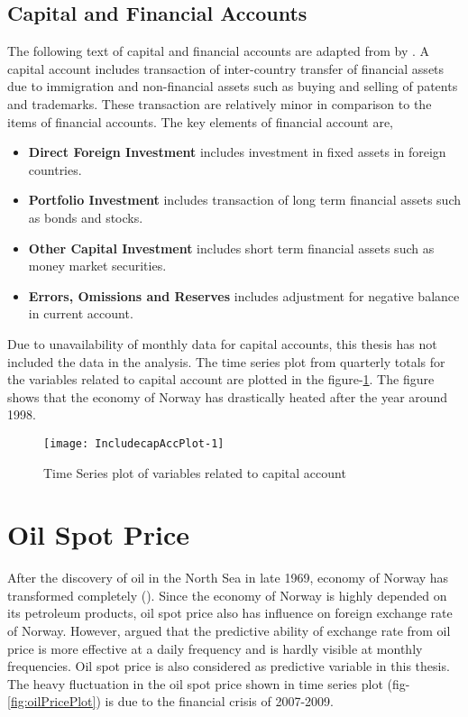 \documentclass[12pt, lot, lof]{thesis}\usepackage[]{graphicx}\usepackage[]{color}
\makeatletter
\def\maxwidth{ %
  \ifdim\Gin@nat@width>\linewidth
    \linewidth
  \else
    \Gin@nat@width
  \fi
}
\makeatother
\begin{document}
\subsection{Capital and Financial Accounts}
\label{ssec:capitalAccount}
The following text of capital and financial accounts are adapted from  by \citet{madura2012international}. A capital account includes transaction of inter-country transfer of financial assets due to immigration and non-financial assets such as buying and selling of patents and trademarks. These transaction are relatively minor in comparison to the items of financial accounts. The key elements of financial account are,

\begin{itemize}
\item \textbf{Direct Foreign Investment} includes investment in fixed assets in foreign countries.
\item \textbf{Portfolio Investment} includes transaction of long term financial assets such as bonds and stocks.
\item \textbf{Other Capital Investment} includes short term financial assets such as money market securities.
\item \textbf{Errors, Omissions and Reserves} includes adjustment for negative balance in current account.
\end{itemize}

Due to unavailability of monthly data for capital accounts, this thesis has not included the data in the analysis. The time series plot from quarterly totals for the variables related to capital account are plotted in the figure-\ref{fig:capAccPlot}. The figure shows that the economy of Norway has drastically heated after the year around 1998.

\begin{Schunk}
\begin{figure}

{\centering \texttt{[image: IncludecapAccPlot-1]} 

}

\caption[Time Series plot of variables related to capital account]{Time Series plot of variables related to capital account\label{fig:capAccPlot}}
\end{figure}
\end{Schunk}

\section{Oil Spot Price}
\label{sec:oilspotprice}
After the discovery of oil in the North Sea in late 1969, economy of Norway has transformed completely (\cite{Eco:RichCousin}). Since the economy of Norway is highly depended on its petroleum products, oil spot price also has influence on foreign exchange rate of Norway. However, \citet{ferraro2012can} argued that the predictive ability of exchange rate from oil price is more effective at a daily frequency and is hardly visible at monthly frequencies. Oil spot price is also considered as predictive variable in this thesis. The heavy fluctuation in the oil spot price shown in time series plot (fig-\ref{fig:oilPricePlot}) is due to the financial crisis of 2007-2009.
\end{document}
